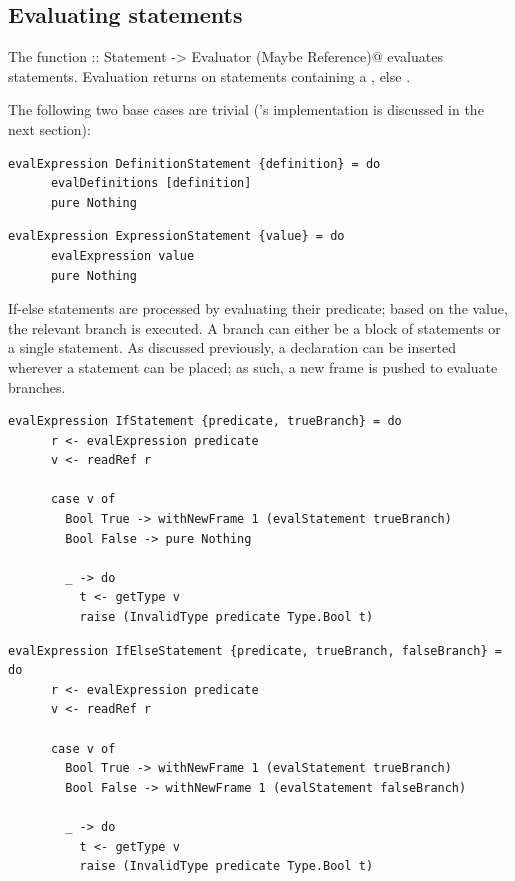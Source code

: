 \documentclass[UdineBachThesis,american,11pt,draft]{PhdThesis}
\begin{document}
  \subsection{Evaluating statements}

  The function
  \lstinline@evalStatement :: Statement -> Evaluator (Maybe Reference)@
  evaluates statements. Evaluation returns \lstinline@Just@ on statements
  containing a \lstinline@return@, else \lstinline@Nothing@.

  The following two base cases are trivial (\lstinline@evalDefinitions@'s
  implementation is discussed in the next section):

  \begin{lstlisting}[gobble=4,basicstyle=\ttfamily\small]
    evalExpression DefinitionStatement {definition} = do
      evalDefinitions [definition]
      pure Nothing
  \end{lstlisting}

  \begin{lstlisting}[gobble=4,basicstyle=\ttfamily\small]
    evalExpression ExpressionStatement {value} = do
      evalExpression value
      pure Nothing
  \end{lstlisting}

  If-else statements are processed by evaluating their predicate; based on the
  value, the relevant branch is executed. A branch can either be a block of
  statements or a single statement. As discussed previously, a declaration can
  be inserted wherever a statement can be placed; as such, a new frame is pushed
  to evaluate branches.

  \begin{lstlisting}[gobble=4,basicstyle=\ttfamily\small]
    evalExpression IfStatement {predicate, trueBranch} = do
      r <- evalExpression predicate
      v <- readRef r

      case v of
        Bool True -> withNewFrame 1 (evalStatement trueBranch)
        Bool False -> pure Nothing

        _ -> do
          t <- getType v
          raise (InvalidType predicate Type.Bool t)
  \end{lstlisting}

  \begin{lstlisting}[gobble=4,basicstyle=\ttfamily\small]
    evalExpression IfElseStatement {predicate, trueBranch, falseBranch} = do
      r <- evalExpression predicate
      v <- readRef r

      case v of
        Bool True -> withNewFrame 1 (evalStatement trueBranch)
        Bool False -> withNewFrame 1 (evalStatement falseBranch)

        _ -> do
          t <- getType v
          raise (InvalidType predicate Type.Bool t)
  \end{lstlisting}
\end{document}
